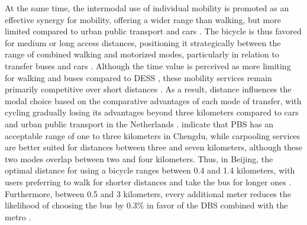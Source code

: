 \begin{refsegment}
At the same time, the intermodal use of individual mobility is promoted as an effective synergy for  mobility, offering a wider range than walking, but more limited compared to urban public transport and cars \textcolor{blue}{\autocite[1934]{chen_study_2013}}. The bicycle is thus favored for medium or long access distances, positioning it strategically between the range of combined walking and motorized modes, particularly in relation to transfer buses and cars \textcolor{blue}{\autocite[1266]{chen_demand_2013}}. Although the time value is perceived as more limiting for walking and buses compared to \acrshort{DESS} \textcolor{blue}{\autocite[9]{baek_electric_2021}}, these mobility services remain primarily competitive over short distances \textcolor{blue}{\autocite[4, 17]{lee_forecasting_2021}}. As a result, distance influences the modal choice based on the comparative advantages of each mode of transfer, with cycling gradually losing its advantages beyond three kilometers compared to cars and urban public transport in the Netherlands \textcolor{blue}{\autocite[359]{givoni_access_2007}}. \textcolor{blue}{\textcite[885]{bi_analysis_2021}} indicate that \acrshort{PBS} has an acceptable range of one to three kilometers in Chengdu, while carpooling services are better suited for distances between three and seven kilometers, although these two modes overlap between two and four kilometers. Thus, in Beijing, the optimal distance for using a bicycle ranges between 0.4 and 1.4 kilometers, with users preferring to walk for shorter distances and take the bus for longer ones \textcolor{blue}{\autocite[5]{wang_interchange_2016}}. Furthermore, between 0.5 and 3 kilometers, every additional meter reduces the likelihood of choosing the bus by 0.3\% in favor of the \acrshort{DBS} combined with the metro \textcolor{blue}{\autocite[5]{liu_mode_2022}}.%


\end{refsegment}
